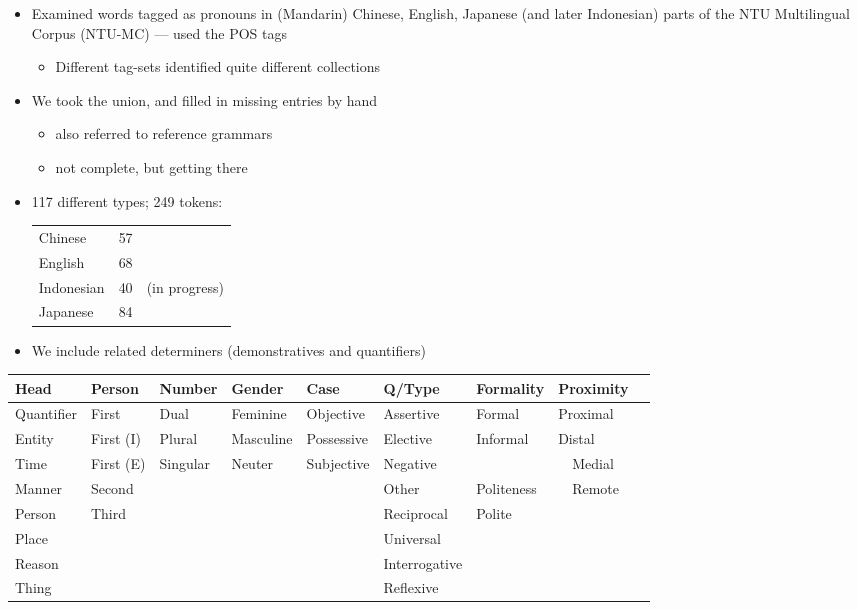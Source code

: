 \documentclass[a4paper,landscape,headrule,footrule,xetex]{foils}
\begin{document}
    \begin{itemize}
       \item Examined words tagged as pronouns in (Mandarin) Chinese, English,
         Japanese (and later Indonesian) parts of the NTU Multilingual
         Corpus (NTU-MC) --- used the POS tags
         \begin{itemize}
         \item Different tag-sets identified quite different collections
         \end{itemize}
       \item We took the union, and filled in missing entries by hand
         \begin{itemize}
         \item also referred to reference grammars
         \item not complete, but getting there 
         \end{itemize}
       \item 117 different types; 249 tokens:
         \begin{tabular}[t]{lrl}
           Chinese & 57\\
           English & 68\\
           Indonesian & 40 & (in progress)\\
           Japanese & 84 
         \end{tabular}
       \item We include related determiners (demonstratives and quantifiers)
       \end{itemize}

\hspace*{-5em}
{\small
\begin{tabular}{lllllllll}
Head &
Person &
Number &
Gender &
Case &
Q/Type &
Formality &
Proximity
\\\hline
Quantifier &
First &
Dual &
Feminine &
Objective &
Assertive &
Formal &
Proximal
\\
Entity &
First (I) & 
Plural &
Masculine &
Possessive &
Elective &
Informal &
Distal
\\
Time &
First (E) & 
Singular &
Neuter &
Subjective &
Negative &
~ &
~~Medial
\\
Manner &
Second &
~ &
~ &
~ &
Other &
Politeness &
~~Remote\\ \cline{7-7}
Person &
Third &
~ &
~ &
~ &
Reciprocal &
Polite &
~ \\
Place &
~ &
~ &
~ &
~ &
Universal &
~ &
~\\
Reason &
~ &
~ &
~ &
~ &
Interrogative &
~ &
~\\
Thing  &
~ &
~ &
~ &
~ &
Reflexive &
~ &
~\\
\end{tabular}}
\end{document}
